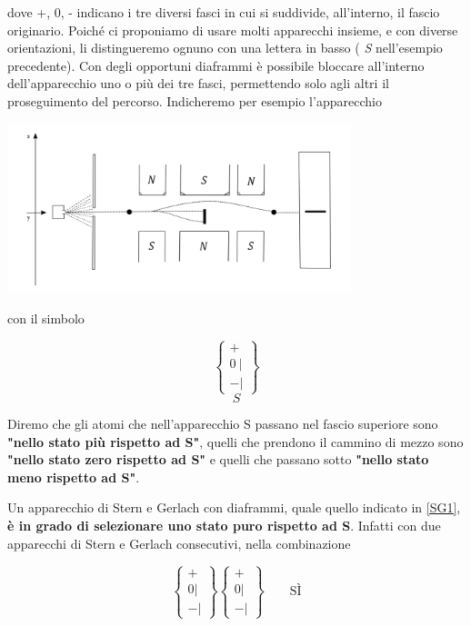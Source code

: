  dove +, 0, - indicano i tre diversi fasci in cui si suddivide, all'interno, il fascio originario. Poiché ci proponiamo di usare molti apparecchi insieme, e con diverse orientazioni, li distingueremo ognuno con una lettera in basso ( \emph{S} nell'esempio precedente). Con degli opportuni diaframmi è possibile bloccare all'interno dell'apparecchio uno o più dei tre fasci, permettendo solo agli altri il proseguimento del percorso. Indicheremo per esempio l'apparecchio \\
\begin{center}
\includegraphics[width=10cm]{immagini/cap_3/fig_3_4.png}
\end{center}
 
con il simbolo
 
\begin{equation}
\begin{Bmatrix} + \\ 0\ | \\ -  |  
\end{Bmatrix}
\label{SG1}
\end{equation}
\begin{equation*}
S
\end{equation*}
 

 
Diremo che gli atomi che nell'apparecchio S passano nel fascio superiore sono \textbf{"nello stato più rispetto ad S"}, quelli che prendono il cammino di mezzo sono \textbf{"nello stato zero rispetto ad S"} e quelli che passano sotto \textbf{"nello stato meno rispetto ad S"}.

Un apparecchio di Stern e Gerlach con diaframmi, quale quello indicato in \eqref{SG1}, \textbf{è in grado di selezionare uno stato puro rispetto ad S}. Infatti con due apparecchi di Stern e Gerlach consecutivi, nella combinazione

\begin{equation}
\begin{Bmatrix}
 + \\ 0 | \\ - |  
\end{Bmatrix}
\begin{Bmatrix}
 + \\ 0 | \\ - |  
\end{Bmatrix} \qquad \text{SÌ}
\label{SG2}
\end{equation}
 
